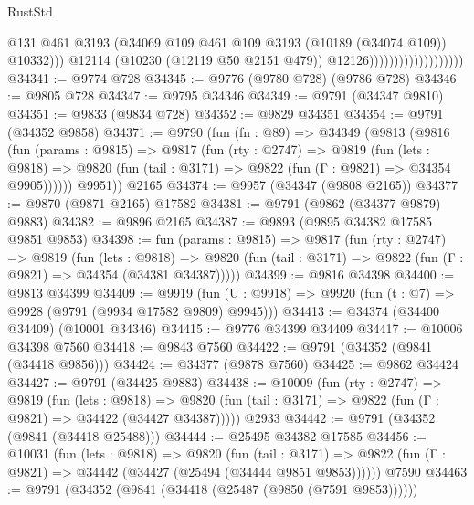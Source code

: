 \begin{lexlean}{RustStd}
\begin{coremodule}
                                              @131
                                              @461
                                              @3193
                                              (@34069
                                                @109
                                                @461
                                                @109
                                                @3193
                                                (@10189 (@34074 @109))
                                                @10332)))
                                          @12114
                                          (@10230 (@12119 @50 @2151 @479))
                                          @12126)))))))))))))))))))
@34341 := @9774 @728
@34345 := @9776 (@9780 @728) (@9786 @728)
@34346 := @9805 @728
@34347 := @9795 @34346
@34349 := @9791 (@34347 @9810)
@34351 := @9833 (@9834 @728)
@34352 := @9829 @34351
@34354 := @9791 (@34352 @9858)
@34371 := @9790
    (fun (fn : @89) =>
    @34349
      (@9813
        (@9816
          (fun (params : @9815) =>
          @9817
            (fun (rty : @2747) =>
            @9819
              (fun (lets : @9818) =>
              @9820 (fun (tail : @3171) => @9822 (fun (Γ : @9821) => @34354 @9905))))))
        @9951))
    @2165
@34374 := @9957 (@34347 (@9808 @2165))
@34377 := @9870 (@9871 @2165) @17582
@34381 := @9791 (@9862 (@34377 @9879) @9883)
@34382 := @9896 @2165
@34387 := @9893 (@9895 @34382 @17585 @9851 @9853)
@34398 := fun (params : @9815) =>
  @9817
    (fun (rty : @2747) =>
    @9819
      (fun (lets : @9818) =>
      @9820 (fun (tail : @3171) => @9822 (fun (Γ : @9821) => @34354 (@34381 @34387)))))
@34399 := @9816 @34398
@34400 := @9813 @34399
@34409 := @9919
    (fun (U : @9918) => @9920 (fun (t : @7) => @9928 (@9791 (@9934 @17582 @9809) @9945)))
@34413 := @34374 (@34400 @34409) (@10001 @34346)
@34415 := @9776 @34399 @34409
@34417 := @10006 @34398 @7560
@34418 := @9843 @7560
@34422 := @9791 (@34352 (@9841 (@34418 @9856)))
@34424 := @34377 (@9878 @7560)
@34425 := @9862 @34424
@34427 := @9791 (@34425 @9883)
@34438 := @10009
    (fun (rty : @2747) =>
    @9819
      (fun (lets : @9818) =>
      @9820 (fun (tail : @3171) => @9822 (fun (Γ : @9821) => @34422 (@34427 @34387)))))
    @2933
@34442 := @9791 (@34352 (@9841 (@34418 @25488)))
@34444 := @25495 @34382 @17585
@34456 := @10031
    (fun (lets : @9818) =>
    @9820
      (fun (tail : @3171) =>
      @9822 (fun (Γ : @9821) => @34442 (@34427 (@25494 (@34444 @9851 @9853))))))
    @7590
@34463 := @9791 (@34352 (@9841 (@34418 (@25487 (@9850 (@7591 @9853))))))

\end{coremodule}
\end{lexlean}
